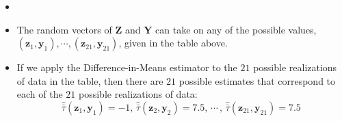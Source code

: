 \documentclass[table, xcolor={dvipsnames}, 9pt]{beamer}
\theoremstyle{newstyle}
\begin{document}
\begin{frame}
\begin{itemize}
\begin{table}[H]
\end{table}
\item[]
\item The random vectors of $\mathbf{Z}$ and $\mathbf{Y}$ can take on any of the possible values, $\left(\mathbf{z}_1, \mathbf{y}_1\right), \cdots , \left(\mathbf{z}_{21}, \mathbf{y}_{21}\right)$, given in the table above.
\item If we apply the Difference-in-Means estimator to the $21$ possible realizations of data in the table, then there are $21$ possible estimates that correspond to each of the $21$ possible realizations of data:
\begin{equation*}
\hat{\bar{\tau}}\left(\mathbf{z}_1, \mathbf{y}_1\right) = -1, \, \hat{\bar{\tau}}\left(\mathbf{z}_2, \mathbf{y}_2\right) = 7.5, \, \cdots \, , \, \hat{\bar{\tau}}\left(\mathbf{z}_{21}, \mathbf{y}_{21}\right) = 7.5
\end{equation*}
\end{itemize}
\end{frame}
\end{document}

